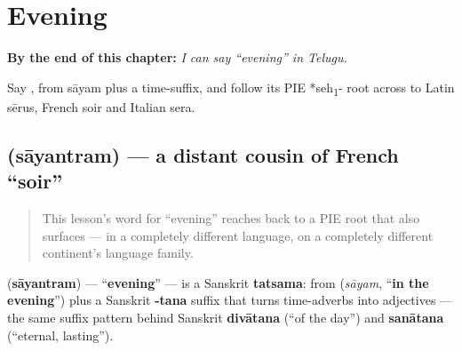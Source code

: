 
\chapter{Evening}
\label{ch:te-evening}

\begin{chapteropening}
\textbf{By the end of this chapter:} \emph{I can say \textquotedblleft{}evening\textquotedblright{} in Telugu.}

Say , from sāyam plus a time-suffix, and follow its PIE *seh\textsubscript{1}- root across to Latin sērus, French soir and Italian sera.
\end{chapteropening}

\section[\texorpdfstring{\te{సాయంత్రం} (sāyantram)}{సాయంత్రం (sāyantram)}]{ (sāyantram) — a distant cousin of French \textquotedblleft{}soir\textquotedblright{}}

\label{lesson:TE-C27-sayantram}



\begin{quote}
This lesson's word for \textquotedblleft{}evening\textquotedblright{} reaches back to a PIE root that also surfaces — in a completely different language, on a completely different continent's language family.
\end{quote}

\begin{cousinweb}
\textbf{} (\textbf{sāyantram}) — \textquotedblleft{}\textbf{evening}\textquotedblright{} — is a Sanskrit \textbf{tatsama}: from \textbf{} (\emph{sāyam}, \textquotedblleft{}\textbf{in the evening}\textquotedblright{}) plus a Sanskrit \textbf{-tana} suffix that turns time-adverbs into adjectives — the same suffix pattern behind Sanskrit \textbf{divātana} (\textquotedblleft{}of the day\textquotedblright{}) and \textbf{sanātana} (\textquotedblleft{}eternal, lasting\textquotedblright{}).
\end{cousinweb}


